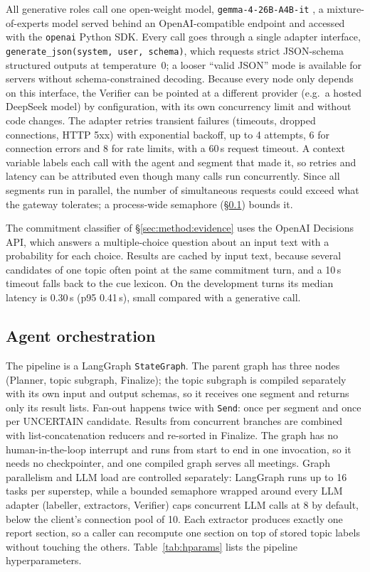All generative roles call one open-weight model, \texttt{gemma-4-26B-A4B-it} \citep{gemmateam2026gemma4}, a mixture-of-experts model served behind an OpenAI-compatible endpoint and accessed with the \texttt{openai} Python SDK.
Every call goes through a single adapter interface, \texttt{generate\_json(system, user, schema)}, which requests strict JSON-schema structured outputs at temperature~0; a looser ``valid JSON'' mode is available for servers without schema-constrained decoding.
Because every node only depends on this interface, the Verifier can be pointed at a different provider (e.g.\ a hosted DeepSeek model) by configuration, with its own concurrency limit and without code changes.
The adapter retries transient failures (timeouts, dropped connections, HTTP 5xx) with exponential backoff, up to 4 attempts, 6 for connection errors and 8 for rate limits, with a 60\,s request timeout.
A context variable labels each call with the agent and segment that made it, so retries and latency can be attributed even though many calls run concurrently.
Since all segments run in parallel, the number of simultaneous requests could exceed what the gateway tolerates; a process-wide semaphore (\S\ref{sec:system:orchestration}) bounds it.

The commitment classifier of \S\ref{sec:method:evidence} uses the OpenAI Decisions API, which answers a multiple-choice question about an input text with a probability for each choice.
Results are cached by input text, because several candidates of one topic often point at the same commitment turn, and a 10\,s timeout falls back to the cue lexicon.
On the development turns its median latency is 0.30\,s (p95 0.41\,s), small compared with a generative call.

\subsection{Agent orchestration}
\label{sec:system:orchestration}

The pipeline is a LangGraph \citep{langgraph} \texttt{StateGraph}.
The parent graph has three nodes (Planner, topic subgraph, Finalize); the topic subgraph is compiled separately with its own input and output schemas, so it receives one segment and returns only its result lists.
Fan-out happens twice with \texttt{Send}: once per segment and once per UNCERTAIN candidate.
Results from concurrent branches are combined with list-concatenation reducers and re-sorted in Finalize.
The graph has no human-in-the-loop interrupt and runs from start to end in one invocation, so it needs no checkpointer, and one compiled graph serves all meetings.
Graph parallelism and LLM load are controlled separately: LangGraph runs up to 16 tasks per superstep, while a bounded semaphore wrapped around every LLM adapter (labeller, extractors, Verifier) caps concurrent LLM calls at 8 by default, below the client's connection pool of 10.
Each extractor produces exactly one report section, so a caller can recompute one section on top of stored topic labels without touching the others.
Table~\ref{tab:hparams} lists the pipeline hyperparameters.

